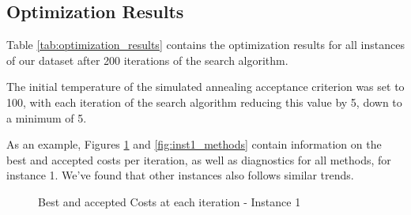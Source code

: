 \documentclass[conference]{IEEEtran}
\begin{document}
\begin{table}[h!]
\caption{General Information of the Dataset Used}
\label{tab:instances}
\centering
{}
\end{table}

\subsection{Optimization Results}

Table \ref{tab:optimization_results} contains the optimization results for all instances of our dataset after 200 iterations of the search algorithm. 

The initial temperature of the simulated annealing acceptance criterion was set to 100, with each iteration of the search algorithm reducing this value by 5, down to a minimum of 5.

As an example, Figures \ref{fig:inst1} and \ref{fig:inst1_methods} contain information on the best and accepted costs per iteration, as well as diagnostics for all methods, for instance 1. We've found that other instances also follows similar trends.

\begin{figure}[h!]
  	  \centering
  	  
      \caption{Best and accepted Costs at each iteration - Instance 1}
      \label{fig:inst1}
\end{figure}
\end{document}
